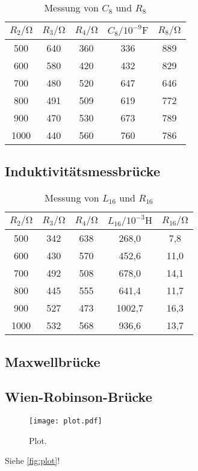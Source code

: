 \begin{table}
  \centering
  \caption{Messung von $C_8$ und $R_8$}
  \label{tab:C8,R8}
  \begin{tabular}{c c c c c}
    \toprule
    $R_2/\unit{\ohm}$ & $R_3/\unit{\ohm}$ & $R_4/\unit{\ohm}$ & $C_8/10^{-9}\unit{\farad}$ & $R_8/\unit{\ohm}$ \\
    \midrule
     500 & 640 & 360 & 336 & 889 \\
     600 & 580 & 420 & 432 & 829 \\
     700 & 480 & 520 & 647 & 646 \\
     800 & 491 & 509 & 619 & 772 \\
     900 & 470 & 530 & 673 & 789 \\
    1000 & 440 & 560 & 760 & 786 \\
    \bottomrule
  \end{tabular}
\end{table}

\subsection{Induktivitätsmessbrücke}
\begin{table}
  \centering
  \caption{Messung von $L_{16}$ und $R_{16}$}
  \label{tab:Cx,Rx}
  \begin{tabular}{c c c c c}
    \toprule
    $R_2/\unit{\ohm}$ & $R_3/\unit{\ohm}$ & $R_4/\unit{\ohm}$ & $L_{16}/10^{-3}\unit{\henry}$ & $R_{16}/\unit{\ohm}$ \\
    \midrule
     500 & 342 & 638 &  268,0 &  7,8 \\
     600 & 430 & 570 &  452,6 & 11,0 \\
     700 & 492 & 508 &  678,0 & 14,1 \\
     800 & 445 & 555 &  641,4 & 11,7 \\
     900 & 527 & 473 & 1002,7 & 16,3 \\
    1000 & 532 & 568 &  936,6 & 13,7 \\
    \bottomrule
  \end{tabular}
\end{table}

\subsection{Maxwellbrücke}

\subsection{Wien-Robinson-Brücke}
\begin{figure}
  \centering
  \texttt{[image: plot.pdf]}
  \caption{Plot.}
  \label{fig:plot}
\end{figure}


Siehe \autoref{fig:plot}!
